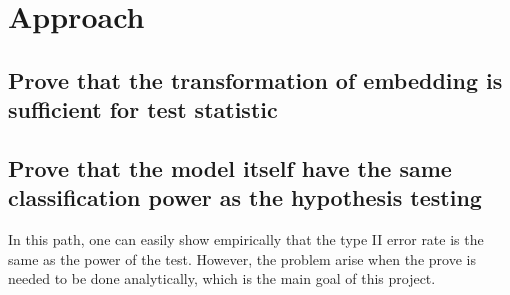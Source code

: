 \documentclass{article}
\begin{document}
\section{Approach}

\subsection{Prove that the transformation of embedding is sufficient for test statistic}
\subsection{Prove that the model itself have the same classification power as the hypothesis testing}
In this path, one can easily show empirically that the type II error rate is the same as the 
power of the test. However, the problem arise when the prove is needed to be done analytically, 
which is the main goal of this project.

\end{document}
